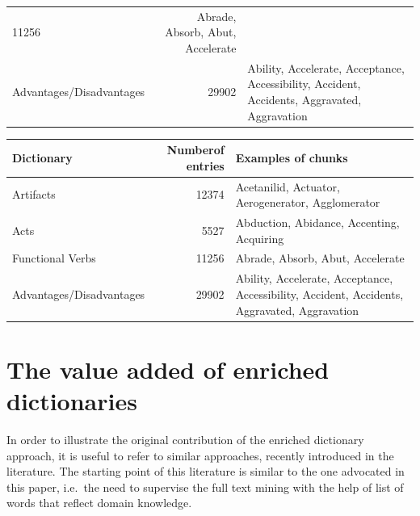 \documentclass[]{book}
\begin{document}
\begin{longtable}[]{@{}lrl@{}}
\begin{minipage}[t]{0.12\columnwidth}
11256\strut
\end{minipage} & \begin{minipage}[t]{0.62\columnwidth}\raggedright\strut
Abrade, Absorb, Abut, Accelerate\strut
\end{minipage}\tabularnewline
\begin{minipage}[t]{0.17\columnwidth}\raggedright\strut
Advantages/Disadvantages\strut
\end{minipage} & \begin{minipage}[t]{0.12\columnwidth}\raggedleft\strut
29902\strut
\end{minipage} & \begin{minipage}[t]{0.62\columnwidth}\raggedright\strut
Ability, Accelerate, Acceptance, Accessibility, Accident, Accidents,
Aggravated, Aggravation\strut
\end{minipage}\tabularnewline
\bottomrule
\end{longtable}

\begin{tabular}{l|r|l}
\hline
Dictionary & Numberof entries & Examples of chunks\\
\hline
Artifacts & 12374 & Acetanilid, Actuator, Aerogenerator, Agglomerator\\
\hline
Acts & 5527 & Abduction, Abidance, Accenting, Acquiring\\
\hline
Functional Verbs & 11256 & Abrade, Absorb, Abut, Accelerate\\
\hline
Advantages/Disadvantages & 29902 & Ability, Accelerate, Acceptance, Accessibility, Accident, Accidents, Aggravated, Aggravation\\
\hline
\end{tabular}

\section{The value added of enriched
dictionaries}\label{the-value-added-of-enriched-dictionaries}

In order to illustrate the original contribution of the enriched
dictionary approach, it is useful to refer to similar approaches,
recently introduced in the literature. The starting point of this
literature is similar to the one advocated in this paper, i.e.~the need
to supervise the full text mining with the help of list of words that
reflect domain knowledge.
\end{document}
